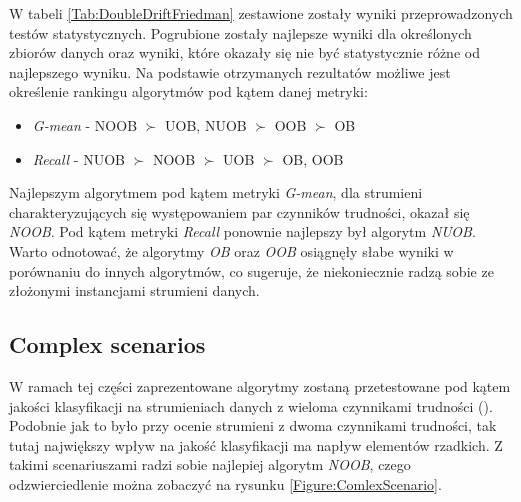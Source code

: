 \noindent W tabeli \ref{Tab:DoubleDriftFriedman} zestawione zostały wyniki przeprowadzonych testów statystycznych. Pogrubione zostały najlepsze wyniki dla określonych zbiorów danych oraz wyniki, które okazały się nie być statystycznie różne od najlepszego wyniku. Na podstawie otrzymanych rezultatów możliwe jest określenie rankingu algorytmów pod kątem danej metryki:

\begin{itemize}
    \item \textit{G-mean} - NOOB $\succ$ UOB, NUOB $\succ$ OOB $\succ$ OB
    \item \textit{Recall} - NUOB $\succ$ NOOB $\succ$ UOB $\succ$ OB, OOB
\end{itemize}

\noindent Najlepszym algorytmem pod kątem metryki \textit{G-mean}, dla strumieni charakteryzujących się występowaniem par czynników trudności, okazał się \textit{NOOB}. Pod kątem metryki \textit{Recall} ponownie najlepszy był algorytm \textit{NUOB}. Warto odnotować, że algorytmy \textit{OB} oraz \textit{OOB} osiągnęły słabe wyniki w porównaniu do innych algorytmów, co sugeruje, że niekoniecznie radzą sobie ze złożonymi instancjami strumieni danych.

\subsection{Complex scenarios}

\noindent W ramach tej części zaprezentowane algorytmy zostaną przetestowane pod kątem jakości klasyfikacji na strumieniach danych z wieloma czynnikami trudności (). Podobnie jak to było przy ocenie strumieni z dwoma czynnikami trudności, tak tutaj największy wpływ na jakość klasyfikacji ma napływ elementów rzadkich. Z takimi scenariuszami radzi sobie najlepiej algorytm \textit{NOOB}, czego odzwierciedlenie można zobaczyć na rysunku \ref{Figure:ComlexScenario}.

\newpage


